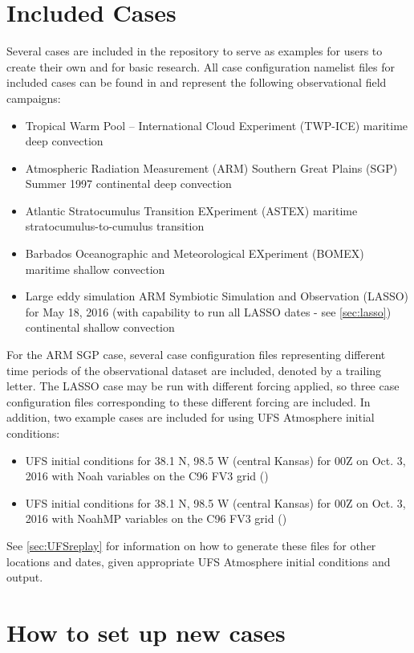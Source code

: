 \section{Included Cases}
Several cases are included in the repository to serve as examples for users to create their own and for basic research. All case configuration namelist files for included cases can be found in  and represent the following observational field campaigns:
\begin{itemize}
\item Tropical Warm Pool -- International Cloud Experiment (TWP-ICE) maritime deep convection
\item Atmospheric Radiation Measurement (ARM) Southern Great Plains (SGP) Summer 1997 continental deep convection
\item Atlantic Stratocumulus Transition EXperiment (ASTEX) maritime stratocumulus-to-cumulus transition
\item Barbados Oceanographic and Meteorological EXperiment (BOMEX) maritime shallow convection
\item Large eddy simulation ARM Symbiotic Simulation and Observation (LASSO) for May 18, 2016 (with capability to run all LASSO dates - see \ref{sec:lasso}) continental shallow convection
\end{itemize}
For the ARM SGP case, several case configuration files representing different time periods of the observational dataset are included, denoted by a trailing letter. The LASSO case may be run with different forcing applied, so three case configuration files corresponding to these different forcing are included. In addition, two example cases are included for using UFS Atmosphere initial conditions:
\begin{itemize}
\item UFS initial conditions for 38.1 N, 98.5 W (central Kansas) for 00Z on Oct. 3, 2016 with Noah variables on the C96 FV3 grid ()
\item UFS initial conditions for 38.1 N, 98.5 W (central Kansas) for 00Z on Oct. 3, 2016 with NoahMP variables on the C96 FV3 grid ()
\end{itemize}
See \ref{sec:UFSreplay} for information on how to generate these files for other locations and dates, given appropriate UFS Atmosphere initial conditions and output.

\section{How to set up new cases}

